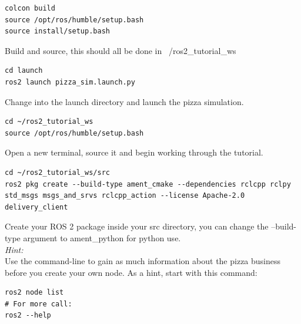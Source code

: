 \documentclass[11pt]{article}
\begin{document}
\begin{lstlisting}
colcon build
source /opt/ros/humble/setup.bash
source install/setup.bash
\end{lstlisting}
Build and source, this should all be done in ~/ros2\_tutorial\_ws\\
\begin{lstlisting}
cd launch
ros2 launch pizza_sim.launch.py
\end{lstlisting}
Change into the launch directory and launch the pizza simulation.\\
\begin{lstlisting}
cd ~/ros2_tutorial_ws
source /opt/ros/humble/setup.bash
\end{lstlisting}
Open a new terminal, source it and begin working through the tutorial.\\
\begin{lstlisting}
cd ~/ros2_tutorial_ws/src
ros2 pkg create --build-type ament_cmake --dependencies rclcpp rclpy std_msgs msgs_and_srvs rclcpp_action --license Apache-2.0 delivery_client
\end{lstlisting}
Create your ROS 2 package inside your src directory, you can change the --build-type argument to ament\_python for python use. \\

\noindent \textit{Hint:}\\
Use the command-line to gain as much information about the pizza business before you create your own node. As a hint, start with this command:\\
\begin{lstlisting}
ros2 node list
# For more call:
ros2 --help
\end{lstlisting}
\end{document}
